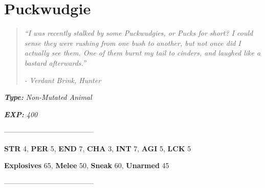 \documentclass[11pt,a4paper,twocolumn]{book}
\begin{document}
	\section*{Puckwudgie}
	\begin{quote}
		\emph{``I was recently stalked by some Puckwudgies, or Pucks for short? I could sense they were rushing from one bush to another, but not once did I actually see them. One of them burnt my tail to cinders, and laughed like a bastard afterwards.''}
		
		\emph{-	Verdant Brink, Hunter}
	\end{quote}
	
	\noindent
	\emph{\textbf{Type:} Non-Mutated Animal}
	
	\noindent
	\emph{\textbf{EXP:} 400}
	
%		
%	
%		
	
	--------------------------------------
	
	\noindent
	\textbf{STR} 4, \textbf{PER} 5, \textbf{END} 7, \textbf{CHA} 3, \textbf{INT} 7, \textbf{AGI} 5, \textbf{LCK} 5
	
	\noindent
	\textbf{Explosives} 65, \textbf{Melee} 50, \textbf{Sneak} 60, \textbf{Unarmed} 45 
	
	--------------------------------------
	
\end{document}
